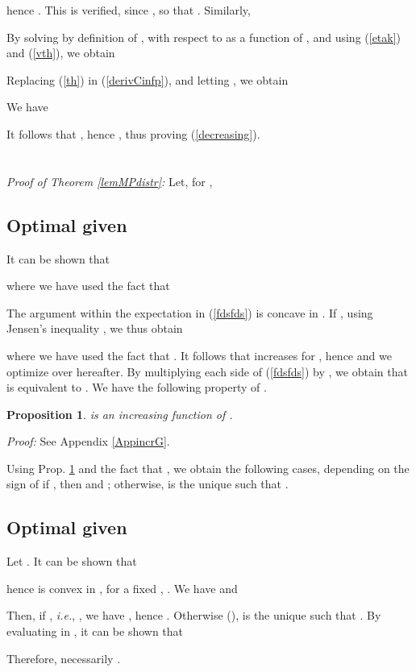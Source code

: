 \documentclass[10pt,twocolumn,twoside]{IEEEtran}
\newtheorem{propos}{Proposition}
\theoremstyle{plain}
\begin{document}
hence .
This is verified, since
, so that .
Similarly, 

By solving  by definition of , 
with respect to  as a function of , and using (\ref{etak}) and (\ref{vth}),
we obtain

 Replacing (\ref{th}) in (\ref{derivCinfp}), and letting ,
 we obtain

We have

It follows that , hence
 , thus proving
 (\ref{decreasing}).
\hfill\QED
\vspace{-3mm}
\section{}
\label{proofoflemMPdistr}
\noindent\emph{Proof of Theorem \ref{lemMPdistr}:}
Let, for ,

\subsection{Optimal  given }
\noindent It can be shown that

where we have used the fact that 

The argument within the expectation in (\ref{fdsfds}) is concave in . If , using Jensen's inequality \cite{Boyd},
we thus obtain

where we have used the fact that .
It follows that  increases for , hence  and we optimize over  hereafter.
By multiplying each side of (\ref{fdsfds}) by , we obtain that
 is equivalent to .
We have the following property of .
\begin{propos}
\label{incrG}
 is an increasing function of .
\end{propos}
\noindent\emph{Proof:}
See Appendix \ref{AppincrG}.
\hfill\QED

\noindent Using Prop. \ref{incrG} and the fact that 
 , we obtain the following cases, depending on the sign of
if , 
  then  and ;
otherwise,
  is the unique  such that .
\subsection{Optimal  given }
\noindent Let . It can be shown that

hence  is convex in , for a fixed , .
We have
 and

Then, if , \emph{i.e.},
, we have , hence 
.
Otherwise (),
 is the unique  such that .
By evaluating  in , it can be shown that

Therefore, necessarily .
\end{document}
